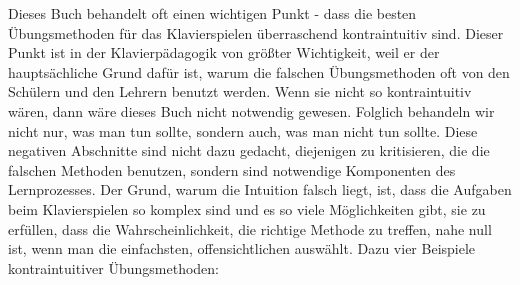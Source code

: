 Dieses Buch behandelt oft einen wichtigen Punkt - dass die besten Übungsmethoden für das Klavierspielen überraschend kontraintuitiv sind.
Dieser Punkt ist in der Klavierpädagogik von größter Wichtigkeit, weil er der hauptsächliche Grund dafür ist, warum die falschen Übungsmethoden oft von den Schülern und den Lehrern benutzt werden.
Wenn sie nicht so kontraintuitiv wären, dann wäre dieses Buch nicht notwendig gewesen.
Folglich behandeln wir nicht nur, was man tun sollte, sondern auch, was man nicht tun sollte.
Diese negativen Abschnitte sind nicht dazu gedacht, diejenigen zu kritisieren, die die falschen Methoden benutzen, sondern sind notwendige Komponenten des Lernprozesses.
Der Grund, warum die Intuition falsch liegt, ist, dass die Aufgaben beim Klavierspielen so komplex sind und es so viele Möglichkeiten gibt, sie zu erfüllen, dass die Wahrscheinlichkeit, die richtige Methode zu treffen, nahe null ist, wenn man die einfachsten, offensichtlichen auswählt.
Dazu vier Beispiele kontraintuitiver Übungsmethoden:


